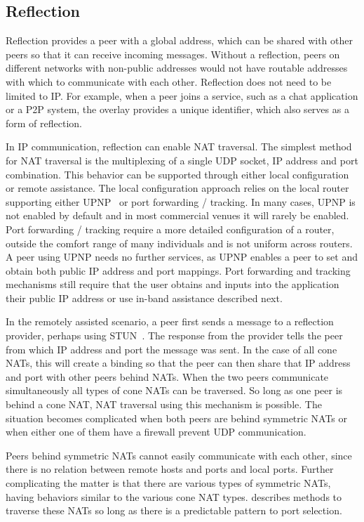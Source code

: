 \documentclass[conference]{IEEEtran}
\begin{document}
\subsection{Reflection}
\label{reflection}

Reflection provides a peer with a global address, which can be shared with
other peers so that it can receive incoming messages.  Without a reflection,
peers on different networks with non-public addresses would not have routable
addresses with which to communicate with each other.  Reflection does not need
to be limited to IP.  For example, when a peer joins a service, such as a chat
application or a P2P system, the overlay provides a unique identifier, which
also serves as a form of reflection.

In IP communication, reflection can enable NAT traversal.  The simplest method
for NAT traversal is the multiplexing of a single UDP socket, IP address and
port combination.  This behavior can be supported through either local
configuration or remote assistance.  The local configuration approach relies on
the local router supporting either UPNP~\cite{upnp} or port forwarding /
tracking.  In many cases, UPNP is not enabled by default and in most commercial
venues it will rarely be enabled.  Port forwarding / tracking require a more
detailed configuration of a router, outside the comfort range of many
individuals and is not uniform across routers.  A peer using UPNP needs no
further services, as UPNP enables a peer to set and obtain both public IP
address and port mappings.  Port forwarding and tracking mechanisms still
require that the user obtains and inputs into the application their public IP
address or use in-band assistance described next.

In the remotely assisted scenario, a peer first sends a message to a reflection
provider, perhaps using STUN~\cite{stun_rfc}.  The response from the provider
tells the peer from which IP address and port the message was sent.  In the
case of all cone NATs, this will create a binding so that the peer can then
share that IP address and port with other peers behind NATs.  When the two
peers communicate simultaneously all types of cone NATs can be traversed.  So
long as one peer is behind a cone NAT, NAT traversal using this mechanism is
possible.  The situation becomes complicated when both peers are behind
symmetric NATs or when either one of them have a firewall prevent UDP
communication.  

Peers behind symmetric NATs cannot easily communicate with each other, since
there is no relation between remote hosts and ports and local ports.  Further
complicating the matter is that there are various types of symmetric NATs,
having behaviors similar to the various cone NAT types.  \cite{ice} describes
methods to traverse these NATs so long as there is a predictable pattern to
port selection.  
\end{document}
